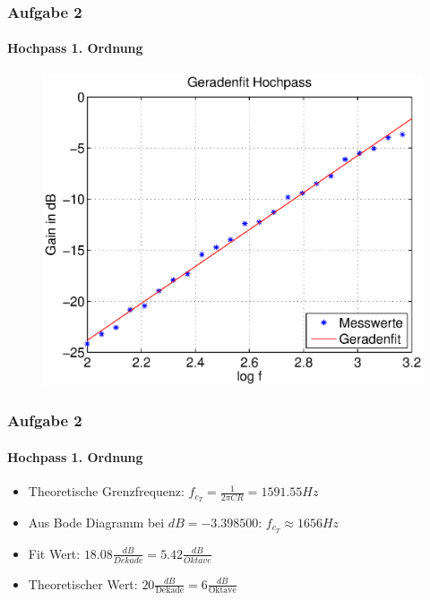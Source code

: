 \begin{frame}
    \frametitle{Aufgabe 2}
    \framesubtitle{Hochpass 1. Ordnung}
    \begin{figure}[H]
    \begin{center}
            \includegraphics[scale=0.6]{./img/2b_Fit.eps}
    \end{center}
    \end{figure}
\end{frame}
\begin{frame}
    \frametitle{Aufgabe 2}
    \framesubtitle{Hochpass 1. Ordnung}
     \begin{itemize}
        \item Theoretische Grenzfrequenz: $f_{c_T} = \frac{1}{2 \pi C
        R}=1591.55Hz$ 
        \item Aus Bode Diagramm bei $dB=-3.398500$: $f_{c_T} \approx 1656 Hz$
        \item Fit Wert: $18.08 \frac{dB}{Dekade}= 5.42 \frac{dB}{Oktave}$
        \item Theoretischer Wert:
        $20\frac{dB}{\text{Dekade}}=6\frac{dB}{\text{Oktave}}$
     \end{itemize}
\end{frame}

